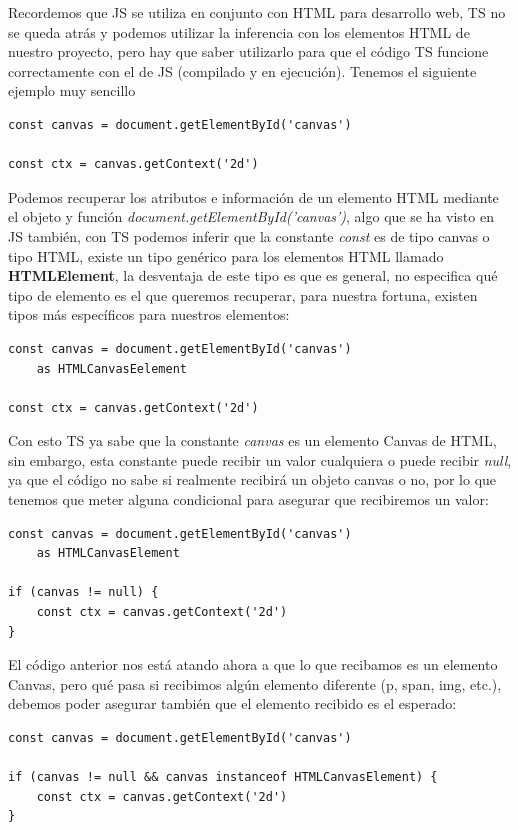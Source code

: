 Recordemos que JS se utiliza en conjunto con HTML para desarrollo web, TS no se queda atrás y podemos utilizar la inferencia con los elementos HTML de nuestro proyecto, pero hay que saber utilizarlo para que el código TS funcione correctamente con el de JS (compilado y en ejecución). Tenemos el siguiente ejemplo muy sencillo
\begin{lstlisting}
const canvas = document.getElementById('canvas')

const ctx = canvas.getContext('2d')
\end{lstlisting}

Podemos recuperar los atributos e información de un elemento HTML mediante el objeto y función \textit{document.getElementById('canvas')}, algo que se ha visto en JS también, con TS podemos inferir que la constante \textit{const} es de tipo canvas o tipo HTML, existe un tipo genérico para los elementos HTML llamado \textbf{HTMLElement}, la desventaja de este tipo es que es general, no especifica qué tipo de elemento es el que queremos recuperar, para nuestra fortuna, existen tipos más específicos para nuestros elementos:
\begin{lstlisting}
const canvas = document.getElementById('canvas')
    as HTMLCanvasEelement

const ctx = canvas.getContext('2d')
\end{lstlisting}

Con esto TS ya sabe que la constante \textit{canvas} es un elemento Canvas de HTML, sin embargo, esta constante puede recibir un valor cualquiera o puede recibir \textit{null}, ya que el código no sabe si realmente recibirá un objeto canvas o no, por lo que tenemos que meter alguna condicional para asegurar que recibiremos un valor:
\begin{lstlisting}
const canvas = document.getElementById('canvas')
    as HTMLCanvasElement

if (canvas != null) {
    const ctx = canvas.getContext('2d')
}
\end{lstlisting}

El código anterior nos está atando ahora a que lo que recibamos es un elemento Canvas, pero qué pasa si recibimos algún elemento diferente (p, span, img, etc.), debemos poder asegurar también que el elemento recibido es el esperado:
\begin{lstlisting}
const canvas = document.getElementById('canvas')

if (canvas != null && canvas instanceof HTMLCanvasElement) {
    const ctx = canvas.getContext('2d')
}
\end{lstlisting}

